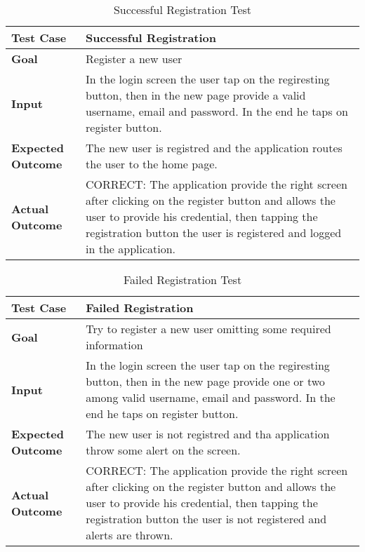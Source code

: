 \begin{table}[H]
	\centering
	\begin{tabular}{|l|l|}
	\hline
	\textbf{Test Case}& Successful Registration\\
	\hline
	\textbf{Goal}& Register a new user\\
	\hline
	\textbf{Input}& 
	\begin{minipage}{.7\linewidth}
	In the login screen the user tap on the regiresting button, then in the new page provide a valid username, email and password. In the end he taps on register button.
	\end{minipage}\\
	\hline
	\textbf{Expected Outcome}& 
	\begin{minipage}{.7\linewidth}
	The new user is registred and the application routes the user to the home page.
	\end{minipage}\\
	\hline
	\textbf{Actual Outcome}& 
	\begin{minipage}{.7\linewidth}
	CORRECT: The application provide the right screen after clicking on the register button and allows the user to provide his credential, then tapping the registration button the user is registered and logged in the application.
	\end{minipage}\\
	\hline	
	\end{tabular}
	\caption{Successful Registration Test}
\end{table}

\begin{table}[H]
	\centering
	\begin{tabular}{|l|l|}
	\hline
	\textbf{Test Case}& Failed Registration\\
	\hline
	\textbf{Goal}& Try to register a new user omitting some required information\\
	\hline
	\textbf{Input}& 
	\begin{minipage}{.7\linewidth}
	In the login screen the user tap on the regiresting button, then in the new page provide one or two among valid username, email and password. In the end he taps on register button.
	\end{minipage}\\
	\hline
	\textbf{Expected Outcome}&
	\begin{minipage}{.7\linewidth}
	The new user is not registred and tha application throw some alert on the screen.
	\end{minipage}\\
	\hline
	\textbf{Actual Outcome}& 
	\begin{minipage}{.7\linewidth}
	CORRECT: The application provide the right screen after clicking on the register button and allows the user to provide his credential, then tapping the registration button the user is not registered and alerts are thrown.
	\end{minipage}\\
	\hline	
	\end{tabular}
	\caption{Failed Registration Test}
\end{table}

